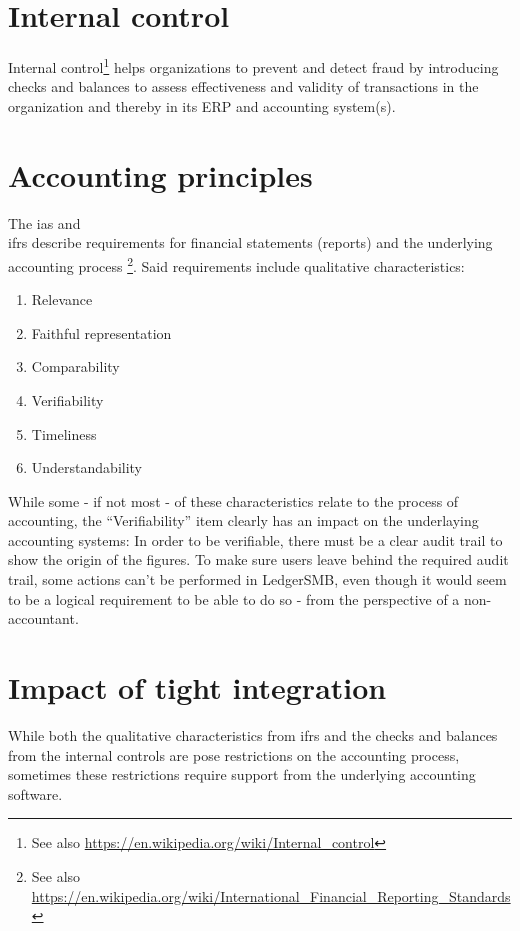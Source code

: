 \section{Internal control}
\label{sec-advocacy-internal-control}

Internal control\footnote{See also \url{https://en.wikipedia.org/wiki/Internal_control}}
helps organizations to prevent and detect fraud by introducing checks and balances
to assess effectiveness and validity of transactions in the organization and thereby
in its \gls{ERP} and accounting system(s).

\section{Accounting principles}
\label{sec-system-accounting-principles}

The \gls{ias} and\\ 
\gls{ifrs} describe requirements
for financial statements (reports) and the underlying accounting process
\footnote{See also \url{https://en.wikipedia.org/wiki/International_Financial_Reporting_Standards}}.
Said requirements include qualitative characteristics:

\begin{enumerate}
\item Relevance
\item Faithful representation
\item Comparability
\item Verifiability
\item Timeliness
\item Understandability
\end{enumerate}

While some - if not most - of these characteristics relate to the process of accounting,
the ``Verifiability'' item clearly has an impact on the underlaying accounting systems:
In order to be verifiable, there must be a clear audit trail to show the origin of the
figures. To make sure users leave behind the required audit trail, some actions can't
be performed in LedgerSMB, even though it would seem to be a logical requirement to be
able to do so - from the perspective of a non-accountant.


\section{Impact of tight integration}
\label{sec-system-impact-of-tight-integration}

While both the qualitative characteristics from \gls{ifrs} and the checks and balances
from the internal controls are pose restrictions on the accounting process,
sometimes these restrictions require support from the underlying accounting
software.

